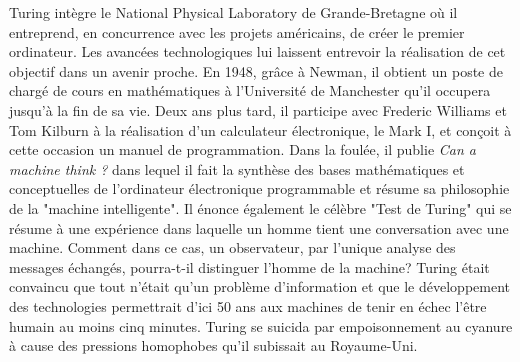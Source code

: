 Turing intègre le National Physical Laboratory de Grande-Bretagne où il entreprend, en concurrence avec les projets américains, de créer le premier ordinateur. Les avancées technologiques lui laissent entrevoir la réalisation de cet objectif dans un avenir proche. En 1948, grâce à Newman, il obtient un poste de chargé de cours en mathématiques à l'Université de Manchester qu'il occupera jusqu'à la fin de sa vie. Deux ans plus tard, il participe avec Frederic Williams et Tom Kilburn à la réalisation d'un calculateur électronique, le Mark I, et conçoit à cette occasion un manuel de programmation. Dans la foulée, il publie \textit{Can a machine think ?} dans lequel il fait la synthèse des bases mathématiques et conceptuelles de l'ordinateur électronique programmable et résume sa philosophie de la "machine intelligente". Il énonce également le célèbre "Test de Turing" qui se résume à une expérience dans laquelle un homme tient une conversation avec une machine. Comment dans ce cas, un observateur, par l'unique analyse des messages échangés, pourra-t-il distinguer l'homme de la machine? Turing était convaincu que tout n'était qu'un problème d'information et que le développement des technologies permettrait d'ici 50 ans aux machines de tenir en échec l'être humain au moins cinq minutes. Turing se suicida par empoisonnement au cyanure à cause des pressions homophobes qu'il subissait au Royaume-Uni.

{}
\label{sec:V}


